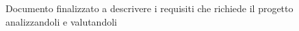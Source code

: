 Documento finalizzato a descrivere i requisiti che richiede il progetto analizzandoli e valutandoli 